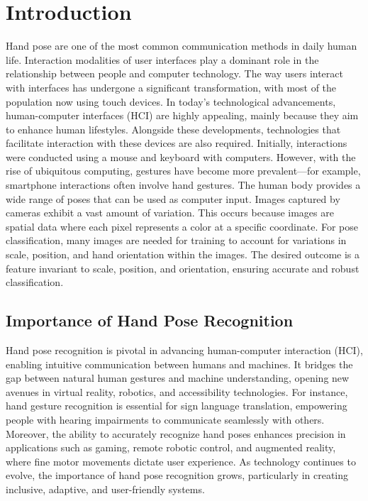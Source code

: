 \chapter{Introduction}

Hand pose are one of the most common communication methods in daily human life. Interaction modalities of user interfaces play a dominant role in the relationship between people and computer technology. The way users interact with interfaces has undergone a significant transformation, with most of the population now using touch devices. In today's technological advancements, human-computer interfaces (HCI) are highly appealing, mainly because they aim to enhance human lifestyles. Alongside these developments, technologies that facilitate interaction with these devices are also required. Initially, interactions were conducted using a mouse and keyboard with computers. However, with the rise of ubiquitous computing, gestures have become more prevalent—for example, smartphone interactions often involve hand gestures. The human body provides a wide range of poses that can be used as computer input. Images captured by cameras exhibit a vast amount of variation. This occurs because images are spatial data where each pixel represents a color at a specific coordinate. For pose classification, many images are needed for training to account for variations in scale, position, and hand orientation within the images. The desired outcome is a feature invariant to scale, position, and orientation, ensuring accurate and robust classification.

\section{Importance of Hand Pose Recognition}

Hand pose recognition is pivotal in advancing human-computer interaction (HCI), enabling intuitive communication between humans and machines. It bridges the gap between natural human gestures and machine understanding, opening new avenues in virtual reality, robotics, and accessibility technologies. For instance, hand gesture recognition is essential for sign language translation, empowering people with hearing impairments to communicate seamlessly with others. Moreover, the ability to accurately recognize hand poses enhances precision in applications such as gaming, remote robotic control, and augmented reality, where fine motor movements dictate user experience. As technology continues to evolve, the importance of hand pose recognition grows, particularly in creating inclusive, adaptive, and user-friendly systems.

